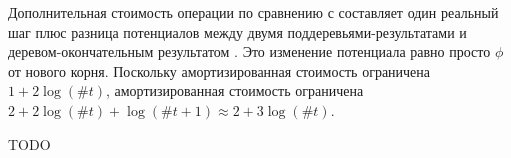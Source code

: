 \begin{frame}[fragile]{}
Дополнительная стоимость операции  по сравнению с
 составляет один реальный шаг плюс разница
потенциалов между двумя поддеревьями-результатами
 и деревом-окончательным результатом
. Это изменение потенциала равно просто $\phi$ от
нового корня. Поскольку амортизированная стоимость
 ограничена $1 + 2\log(\#t)$, амортизированная
стоимость  ограничена
$2 + 2\log(\#t) + \log(\#t + 1) \approx 2 + 3\log(\#t)$.

TODO
\end{frame}
